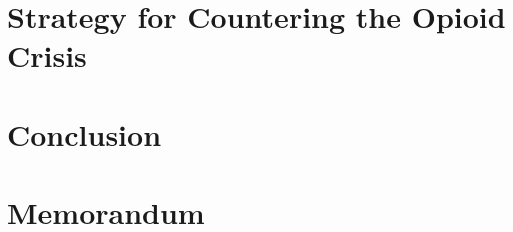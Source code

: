 \documentclass[12pt]{article} %
\begin{document}
\section{Strategy for Countering the Opioid Crisis}




\section{Conclusion} %

\newpage
\section{Memorandum}


\newpage
\end{document}
